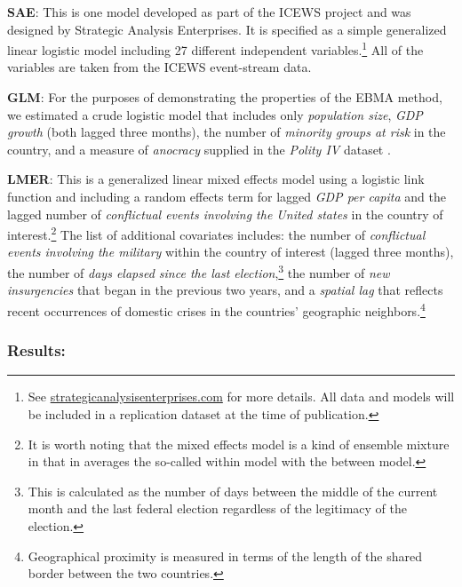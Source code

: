 \documentclass[12pt,fullpage,endnotes]{article}
\newcommand{\note}[1]{\footnote{ #1 \vspace{4 mm}}}
\begin{document}
\begin{list}{}{\leftmargin=1em}
\item \textbf{SAE}: This is one model developed as part of the ICEWS
  project and was designed by Strategic Analysis Enterprises. It is
  specified as a simple generalized linear logistic model including 27
  different independent variables.\note{See
    \url{strategicanalysisenterprises.com} for more details.  All data
    and models will be included in a replication dataset at the time
    of publication.}  All of the variables are taken from the ICEWS
  event-stream data.
\item \textbf{GLM}: For the purposes of demonstrating the properties
  of the EBMA method, we estimated a crude logistic model that
  includes only \textit{population size}, \textit{GDP growth} (both
  lagged three months), the number of \textit{minority groups at risk} in the country,
  and a measure of \textit{anocracy} supplied in the \textit{Polity IV} dataset
  \citep{PolityIV}.
\item \textbf{LMER}: This is a generalized linear mixed effects model
  using a logistic link function and including a random effects term
  for lagged \textit{GDP per capita} and the lagged number of
  \textit{conflictual events involving the United states} in the
  country of interest.\note{It is worth noting that the mixed effects model is a kind of 
  ensemble mixture in that in averages the so-called within model with the between model.} The list of additional covariates includes: the
  number of \textit{conflictual events involving the military} within
  the country of interest (lagged three months), the number of
  \textit{days elapsed since the last election},\note{This is
    calculated as the number of days between the middle of the current
    month and the last federal election regardless of the legitimacy
    of the election.} the number of \textit{new insurgencies} that
  began in the previous two years, and a \textit{spatial lag} that
  reflects recent occurrences of domestic crises in the countries'
  geographic neighbors.\note{Geographical proximity is measured in
    terms of the length of the shared border between the two
    countries.}
\end{list}


\subsubsection{Results:}
\end{document}
